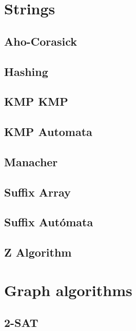 \section{Strings}
\subsection{Aho-Corasick}
\raggedbottom
\hrulefill
\subsection{	Hashing}
\raggedbottom
\hrulefill
\subsection{KMP		KMP}
\raggedbottom
\hrulefill
\subsection{KMP Automata}
\raggedbottom
\hrulefill
\subsection{Manacher}
\raggedbottom
\hrulefill
\subsection{Suffix Array}
\raggedbottom
\hrulefill
\subsection{Suffix Autómata}
\raggedbottom
\hrulefill
\subsection{   Z Algorithm}
\raggedbottom
\hrulefill

\section{Graph algorithms}
\subsection{   2-SAT}
\raggedbottom
\hrulefill
